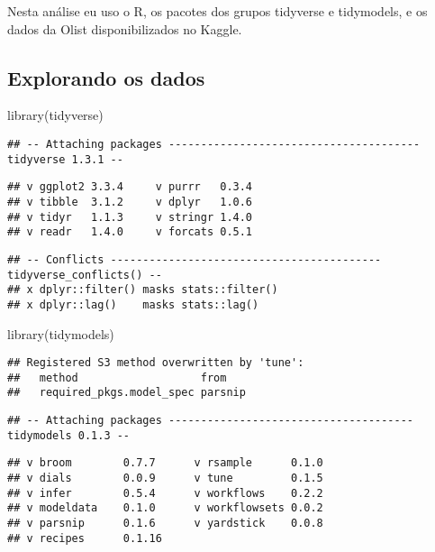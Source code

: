 \documentclass[
]{article}
\newenvironment{Shaded}{\begin{snugshade}}{\end{snugshade}}
\newcommand{\FunctionTok}[1]{\textcolor[rgb]{0.00,0.00,0.00}{#1}}
\newcommand{\NormalTok}[1]{#1}
\begin{document}
Nesta análise eu uso o R, os pacotes dos grupos tidyverse e tidymodels,
e os dados da Olist disponibilizados no Kaggle.

\hypertarget{explorando-os-dados}{%
\subsection{Explorando os dados}\label{explorando-os-dados}}

\begin{Shaded}
\begin{Highlighting}[]
\FunctionTok{library}\NormalTok{(tidyverse)}
\end{Highlighting}
\end{Shaded}

\begin{verbatim}
## -- Attaching packages --------------------------------------- tidyverse 1.3.1 --
\end{verbatim}

\begin{verbatim}
## v ggplot2 3.3.4     v purrr   0.3.4
## v tibble  3.1.2     v dplyr   1.0.6
## v tidyr   1.1.3     v stringr 1.4.0
## v readr   1.4.0     v forcats 0.5.1
\end{verbatim}

\begin{verbatim}
## -- Conflicts ------------------------------------------ tidyverse_conflicts() --
## x dplyr::filter() masks stats::filter()
## x dplyr::lag()    masks stats::lag()
\end{verbatim}

\begin{Shaded}
\begin{Highlighting}[]
\FunctionTok{library}\NormalTok{(tidymodels)}
\end{Highlighting}
\end{Shaded}

\begin{verbatim}
## Registered S3 method overwritten by 'tune':
##   method                   from   
##   required_pkgs.model_spec parsnip
\end{verbatim}

\begin{verbatim}
## -- Attaching packages -------------------------------------- tidymodels 0.1.3 --
\end{verbatim}

\begin{verbatim}
## v broom        0.7.7      v rsample      0.1.0 
## v dials        0.0.9      v tune         0.1.5 
## v infer        0.5.4      v workflows    0.2.2 
## v modeldata    0.1.0      v workflowsets 0.0.2 
## v parsnip      0.1.6      v yardstick    0.0.8 
## v recipes      0.1.16
\end{verbatim}
\end{document}
